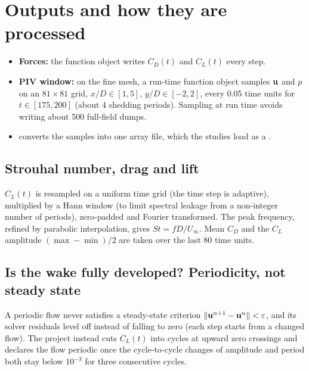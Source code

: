 \section{Outputs and how they are processed}
\begin{itemize}
\item \textbf{Forces:} the  function object writes $C_D(t)$ and $C_L(t)$ every step.
\item \textbf{PIV window:} on the fine mesh, a run-time  function object samples $\mathbf{u}$ and $p$ on an $81\times81$ grid, $x/D\in[1,5]$, $y/D\in[-2,2]$, every 0.05 time units for $t\in[175,200]$ (about 4 shedding periods). Sampling at run time avoids writing about 500 full-field dumps.
\item {} converts the samples into one array file, which the studies load as a .
\end{itemize}

\subsection{Strouhal number, drag and lift}
$C_L(t)$ is resampled on a uniform time grid (the time step is adaptive), multiplied by a Hann window (to limit spectral leakage from a non-integer number of periods), zero-padded and Fourier transformed. The peak frequency, refined by parabolic interpolation, gives $St=fD/U_\infty$. Mean $C_D$ and the $C_L$ amplitude $(\max-\min)/2$ are taken over the last 80 time units.

\subsection{Is the wake fully developed? Periodicity, not steady state}
A periodic flow never satisfies a steady-state criterion $\|\mathbf{u}^{n+1}-\mathbf{u}^n\|<\varepsilon$, and its solver residuals level off instead of falling to zero (each step starts from a changed flow). The project instead cuts $C_L(t)$ into cycles at upward zero crossings and declares the flow periodic once the cycle-to-cycle changes of amplitude and period both stay below $10^{-3}$ for three consecutive cycles.

